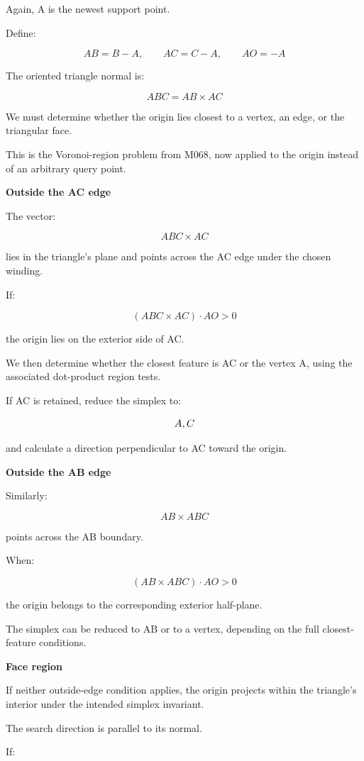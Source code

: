 Again, A is the newest support point.

Define:

\[
AB=B-A,\qquad AC=C-A,\qquad AO=-A
\]

The oriented triangle normal is:

\[
\boxed{ ABC=AB\times AC }
\]

We must determine whether the origin lies closest to a vertex, an edge, or the triangular face.

This is the Voronoi-region problem from M068, now applied to the origin instead of an arbitrary query point.

\textbf{Outside the AC edge}

The vector:

\[
ABC\times AC
\]

lies in the triangle's plane and points across the AC edge under the chosen winding.

If:

\[
\boxed{ (ABC\times AC)\cdot AO>0 }
\]

the origin lies on the exterior side of AC.

We then determine whether the closest feature is AC or the vertex A, using the associated dot-product region tests.

If AC is retained, reduce the simplex to:

\[
\\{A,C\\}
\]

and calculate a direction perpendicular to AC toward the origin.

\textbf{Outside the AB edge}

Similarly:

\[
AB\times ABC
\]

points across the AB boundary.

When:

\[
\boxed{ (AB\times ABC)\cdot AO>0 }
\]

the origin belongs to the corresponding exterior half-plane.

The simplex can be reduced to AB or to a vertex, depending on the full closest-feature conditions.

\textbf{Face region}

If neither outside-edge condition applies, the origin projects within the triangle's interior under the intended simplex invariant.

The search direction is parallel to its normal.

If:

